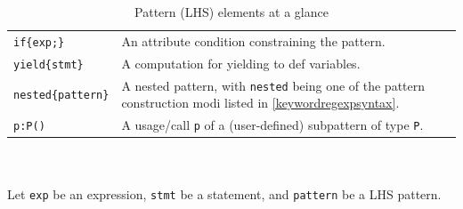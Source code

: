 \begin{table}[htbp]
\begin{minipage}{\linewidth}
\begin{tabularx}{\linewidth}{|lX|}
\hline
\texttt{if\{exp;\}} & An attribute condition constraining the pattern.\\
\texttt{yield\{stmt\}} & A computation for yielding to def variables.\\
\hline
\texttt{nested\{pattern\}} & A nested pattern, with \texttt{nested} being one of the pattern construction modi listed in \ref{keywordregexpsyntax}.\\
\hline
\texttt{p:P()} & A usage/call \texttt{p} of a (user-defined) subpattern of type \texttt{P}.\\
\hline
\end{tabularx}
\end{minipage}\\
\\ 
{\small Let \texttt{exp} be an expression, \texttt{stmt} be a statement, and \texttt{pattern} be a LHS pattern.}
\caption{Pattern (LHS) elements at a glance}
\label{patternstab}
\end{table}

